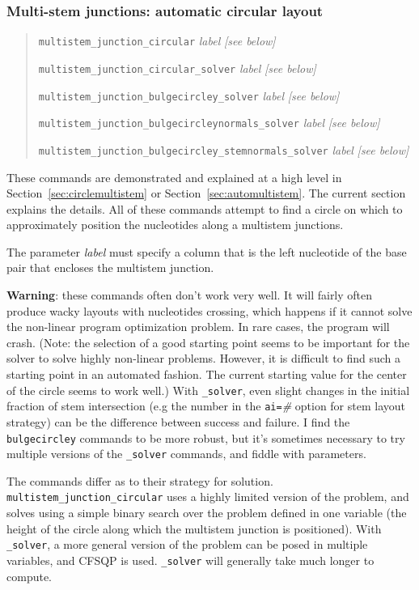 \documentclass[letterpaper,12pt]{report}
\newcommand{\example}[1]{
\begin{quote}
{\raggedright
#1
}
\end{quote}
}
\begin{document}
\subsubsection[Multi{}-stem junctions: automatic circular
layout]{Multi-stem junctions: automatic circular layout}
\label{sec:multistemjunctionsolver}
\example{
{\tt multistem\_junction\_circular}  \textit{label}  \textit{[see below]}

{\tt multistem\_junction\_circular\_solver}  \textit{label}  \textit{[see
below]}

{\tt multistem\_junction\_bulgecircley\_solver}  \textit{label}  \textit{[see
below]}

{\tt multistem\_junction\_bulgecircleynormals\_solver}  \textit{label} 
\textit{[see below]}

{\tt multistem\_junction\_bulgecircley\_stemnormals\_solver}  \textit{label} 
\textit{[see below]}
}

These commands are demonstrated and explained at a high level
in Section~\ref{sec:circlemultistem} or Section~\ref{sec:automultistem}.
The current section explains the details.
All of these commands attempt to find a circle on which to approximately position the nucleotides along a multistem junctions.

The parameter {\it label} must specify a column that is the left nucleotide of the base pair that encloses the multistem junction.

\textbf{Warning}: these commands often don't
work very well. 
It will fairly often produce wacky layouts with nucleotides crossing,
which happens if it cannot solve the non-linear program optimization
problem.  In rare cases, the program will crash.
(Note: the selection of a good starting point seems to be important for
the solver to solve highly non-linear problems.  However, it is difficult
to find such a starting point in an automated fashion.
The current starting value for the center of the circle seems to work well.)
With {\tt \_solver}, even slight changes in the initial fraction of stem
intersection (e.g  the number in the {\tt ai=}\textit{\#} option for stem
layout strategy) can be the difference between success and failure. 
I find the {\tt bulgecircley} commands to be more robust, but it's sometimes necessary
to try multiple versions of the {\tt \_solver} commands, and fiddle with parameters.

The commands differ as to their strategy for solution. 
{\tt multistem\_junction\_circular} uses a highly limited version of the
problem, and solves using a simple binary search over the problem
defined in one variable (the height of the circle along which the multistem junction is positioned).  With {\tt \_solver}, a
more general version of the problem can be posed in multiple variables,
and CFSQP is used. 
{\tt \_solver} will generally take
much longer to compute.
\end{document}
